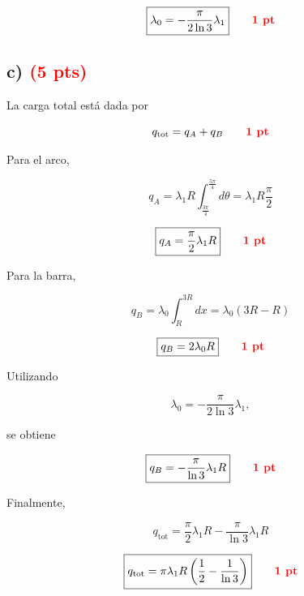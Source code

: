 \documentclass[12pt]{article}
\begin{document}
\[
\boxed{
\lambda_0
=
-\frac{\pi}{2\ln3}\lambda_1
}
\qquad
\textcolor{red}{\textbf{1 pt}}
\]


\subsection*{c) \hfill \textcolor{red}{\textbf{(5 pts)}}}

La carga total está dada por

\[
q_{\text{tot}}
=
q_A+q_B
\qquad
\textcolor{red}{\textbf{1 pt}}
\]

Para el arco,

\[
q_A
=
\lambda_1R
\int_{\frac{3\pi}{4}}^{\frac{5\pi}{4}}d\theta
=
\lambda_1R\frac{\pi}{2}
\]

\[
\boxed{
q_A=\frac{\pi}{2}\lambda_1R
}
\qquad
\textcolor{red}{\textbf{1 pt}}
\]

Para la barra,

\[
q_B
=
\lambda_0
\int_R^{3R}dx
=
\lambda_0(3R-R)
\]

\[
\boxed{
q_B=2\lambda_0R
}
\qquad
\textcolor{red}{\textbf{1 pt}}
\]

Utilizando

\[
\lambda_0
=
-\frac{\pi}{2\ln3}\lambda_1,
\]

se obtiene

\[
\boxed{
q_B
=
-\frac{\pi}{\ln3}\lambda_1R
}
\qquad
\textcolor{red}{\textbf{1 pt}}
\]

Finalmente,

\[
q_{\text{tot}}
=
\frac{\pi}{2}\lambda_1R
-
\frac{\pi}{\ln3}\lambda_1R
\]

\[
\boxed{
q_{\text{tot}}
=
\pi\lambda_1R
\left(
\frac{1}{2}-\frac{1}{\ln3}
\right)
}
\qquad
\textcolor{red}{\textbf{1 pt}}
\]
\end{document}
